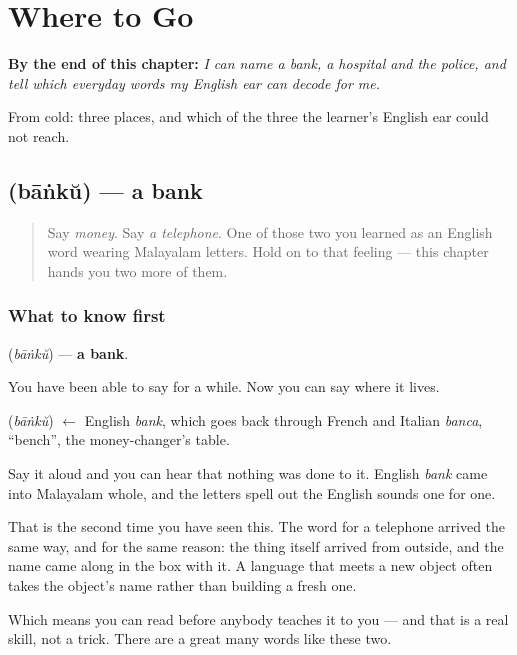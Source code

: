 
\chapter{Where to Go}
\label{ch:ml-places}

\begin{chapteropening}
\textbf{By the end of this chapter:} \emph{I can name a bank, a hospital and the police, and tell which everyday words my English ear can decode for me.}

From cold: three places, and which of the three the learner's English ear could not reach.
\end{chapteropening}

\section[\texorpdfstring{\ml{ബാങ്ക്} (bāṅkŭ)}{ബാങ്ക് (bāṅkŭ)}]{ (bāṅkŭ) — a bank}

\label{lesson:ML-C112-bank}



\begin{quote}
Say \emph{money}. Say \emph{a telephone}. One of those two you learned as an English word wearing Malayalam letters. Hold on to that feeling — this chapter hands you two more of them.
\end{quote}

\subsection*{What to know first}
\textbf{} (\emph{bāṅkŭ}) — \textbf{a bank}.

You have been able to say \textbf{} for a while. Now you can say where it lives.

\begin{cousinweb}
\textbf{} (\emph{bāṅkŭ}) $\leftarrow$ English \emph{bank}, which goes back through French and Italian \emph{banca}, \textquotedblleft{}bench\textquotedblright{}, the money-changer's table.
\end{cousinweb}

\begin{culture}
Say it aloud and you can hear that nothing was done to it. English \emph{bank} came into Malayalam whole, and the letters spell out the English sounds one for one.

That is the second time you have seen this. The word for a telephone arrived the same way, and for the same reason: the thing itself arrived from outside, and the name came along in the box with it. A language that meets a new object often takes the object's name rather than building a fresh one.

Which means you can read \textbf{} before anybody teaches it to you — and that is a real skill, not a trick. There are a great many words like these two.
\end{culture}


